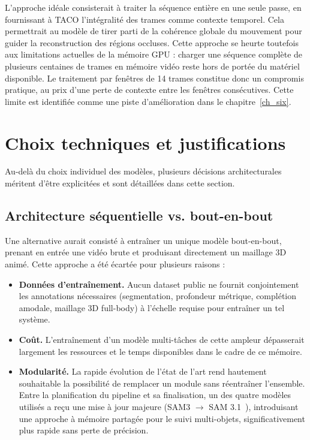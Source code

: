 L'approche idéale consisterait à traiter la séquence entière en une seule passe, en fournissant à TACO l'intégralité des trames comme contexte temporel. Cela permettrait au modèle de tirer parti de la cohérence globale du mouvement pour guider la reconstruction des régions occluses. Cette approche se heurte toutefois aux limitations actuelles de la mémoire GPU : charger une séquence complète de plusieurs centaines de trames en mémoire vidéo reste hors de portée du matériel disponible. Le traitement par fenêtres de 14 trames constitue donc un compromis pratique, au prix d'une perte de contexte entre les fenêtres consécutives. Cette limite est identifiée comme une piste d'amélioration dans le chapitre~\ref{ch_six}.

\section{Choix techniques et justifications}

Au-delà du choix individuel des modèles, plusieurs décisions architecturales méritent d'être explicitées et sont détaillées dans cette section.

\subsection{Architecture séquentielle vs. bout-en-bout}

Une alternative aurait consisté à entraîner un unique modèle bout-en-bout, prenant en entrée une vidéo brute et produisant directement un maillage 3D animé. Cette approche a été écartée pour plusieurs raisons :

\begin{itemize}
  \item \textbf{Données d'entraînement.} Aucun dataset public ne fournit conjointement les annotations nécessaires (segmentation, profondeur métrique, complétion amodale, maillage 3D full-body) à l'échelle requise pour entraîner un tel système.
  \item \textbf{Coût.} L'entraînement d'un modèle multi-tâches de cette ampleur dépasserait largement les ressources et le temps disponibles dans le cadre de ce mémoire.
  \item \textbf{Modularité.} La rapide évolution de l'état de l'art rend hautement souhaitable la possibilité de remplacer un module sans réentraîner l'ensemble. Entre la planification du pipeline et sa finalisation, un des quatre modèles utilisés a reçu une mise à jour majeure (SAM3 $\to$ SAM 3.1~\cite{SAM3.1-2026}), introduisant une approche à mémoire partagée pour le suivi multi-objets, significativement plus rapide sans perte de précision.
\end{itemize}

